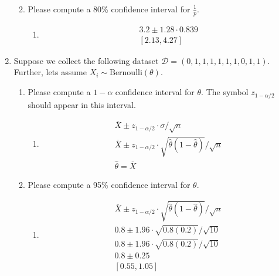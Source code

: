 \documentclass[krantz1,ChapterTOCs]{krantz}
\begin{document}
\begin{enumerate}
\begin{enumerate}
\begin{enumerate}
{            } 
        \end{enumerate}

            \item Please compute a 80\% confidence interval for $\frac{1}{p}$.
        \begin{enumerate}
            \item {
            \color{red} 
                \begin{align}
                     3.2 \pm 1.28 \cdot 0.839\\
                     [2.13, 4.27]
                \end{align}
            } 
        \end{enumerate}

        \end{enumerate}
        
    \item Suppose we collect the following dataset $\mathcal{D} = (0, 1, 1, 1, 1, 1, 1, 0, 1, 1)$. Further, lets assume $X_{i} \sim \text{Bernoulli}(\theta)$.
        \begin{enumerate}
            \item Please compute a $1-\alpha$ confidence interval for $\theta$. The symbol $z_{1-\alpha/2}$ should appear in this interval. 
        \begin{enumerate}
            \item {
            \color{red} 
            
            \begin{align}
                 \overline{X} \pm z_{1-\alpha/2} \cdot \sigma/\sqrt{n} \\
                  \overline{X} \pm z_{1-\alpha/2} \cdot \sqrt{\hat{\theta}(1-\hat{\theta})} /\sqrt{n}\\
                  \hat{\theta} = \overline{X}
            \end{align}
        
            } 
        \end{enumerate}

            \item Please compute a 95\% confidence interval for $\theta$.
        \begin{enumerate}
            \item {
            \color{red} 
                \begin{align}
                  \overline{X} \pm z_{1-\alpha/2} \cdot  \sqrt{\hat{\theta}(1-\hat{\theta})} /\sqrt{n}\\
                  0.8 \pm 1.96 \cdot \sqrt{0.8 (0.2)} / \sqrt{10} \\ 
                  0.8 \pm 1.96 \cdot \sqrt{0.8 (0.2)} / \sqrt{10} \\ 
                  0.8 \pm 0.25 \\
                  [0.55, 1.05]
                \end{align}
        
}
\end{enumerate}
\end{enumerate}
\end{enumerate}
\end{document}
